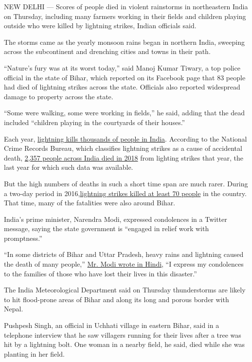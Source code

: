 NEW DELHI --- Scores of people died in violent rainstorms in
northeastern India on Thursday, including many farmers working in their
fields and children playing outside who were killed by lightning
strikes, Indian officials said.

The storms came as the yearly monsoon rains began in northern India,
sweeping across the subcontinent and drenching cities and towns in their
path.

``Nature's fury was at its worst today,'' said Manoj Kumar Tiwary, a top
police official in the state of Bihar, which reported on its Facebook
page that 83 people had died of lightning strikes across the state.
Officials also reported widespread damage to property across the state.

``Some were walking, some were working in fields,'' he said, adding that
the dead included ``children playing in the courtyards of their
houses.''

Each year,
\href{https://indianexpress.com/article/explained/explained-how-lightning-strikes-why-it-kills-5848028/}{lightning
kills thousands of people in India}. According to the National Crime
Records Bureau, which classifies lightning strikes as a cause of
accidental death,
\href{https://ncrb.gov.in/sites/default/files/chapter-1-accidents-2018.pdf}{2,357
people across India died in 2018} from lighting strikes that year, the
last year for which such data was available.

But the high numbers of deaths in such a short time span are much rarer.
During a two-day period in
2016,\href{https://www.nytimes.com/2016/06/23/world/asia/india-lightning-deaths-bihar-monsoon.html}{lightning
strikes killed at least 70 people} in the country. That time, many of
the fatalities were also around Bihar.

India's prime minister, Narendra Modi, expressed condolences in a
Twitter message, saying the state government is ``engaged in relief work
with promptness.''

``In some districts of Bihar and Uttar Pradesh, heavy rains and
lightning caused the death of many people,''
\href{https://twitter.com/narendramodi/status/1276160894557401091}{Mr.
Modi wrote in Hindi}, ``I express my condolences to the families of
those who have lost their lives in this disaster.''

The India Meteorological Department said on Thursday thunderstorms are
likely to hit flood-prone areas of Bihar and along its long and porous
border with Nepal.

Pushpesh Singh, an official in Uchhati village in eastern Bihar, said in
a telephone interview that he saw villagers running for their lives
after a tree was hit by a lightning bolt. One woman in a nearby field,
he said, died while she was planting in her field.


